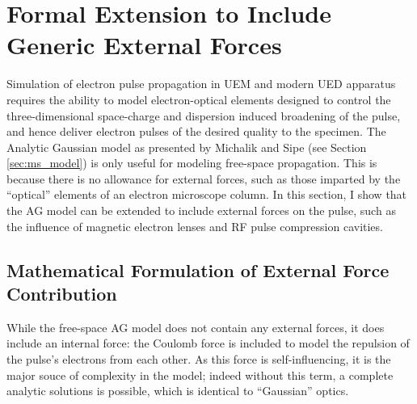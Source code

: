 
\section{Formal Extension to Include Generic External Forces} \label{sec:external_forces}

Simulation of electron pulse propagation in UEM and modern UED apparatus\cite{siwick_ultrafast_2002,oudheusden_electron_2007,reed_femtosecond_2006} requires the ability to model electron-optical elements designed to control the three-dimensional space-charge and dispersion induced broadening of the pulse, and hence deliver electron pulses of the desired quality to the specimen. 
The Analytic Gaussian model as presented by Michalik and Sipe (see Section \ref{sec:ms_model}) is only useful for modeling free-space propagation.
This is because there is no allowance for external forces, such as those imparted by the ``optical'' elements of an electron microscope column.
In this section, I show that the AG model can be extended to include external forces on the pulse, such as the influence of magnetic electron lenses and RF pulse compression cavities.\cite{oudheusden_electron_2007,veisz_hybrid_2007} 

\subsection{Mathematical Formulation of External Force Contribution}

While the free-space AG model does not contain any external forces, it does include an internal force: the Coulomb force is included to model the repulsion of the pulse's electrons from each other.
As this force is self-influencing, it is the major souce of complexity in the model; indeed without this term, a complete analytic solutions is possible, which is identical to ``Gaussian'' optics.\cite{michalik_analytic_2006}

